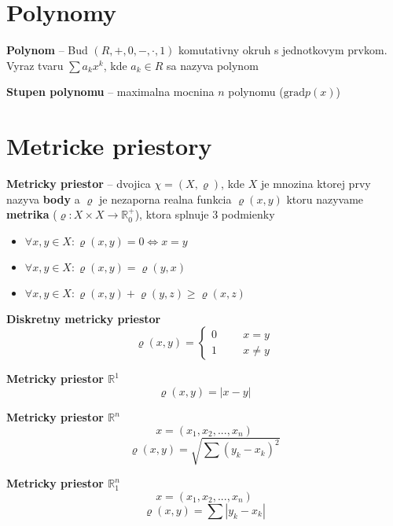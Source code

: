 \documentclass[12pt]{article}
\begin{document}
\section{Polynomy}
\textbf{Polynom} -- Bud $(R,+,0,-,\cdot,1)$ komutativny okruh s jednotkovym prvkom. Vyraz tvaru $\sum{a_{k}x^{k}}$,
kde $a_{k} \in R$ sa nazyva polynom

\textbf{Stupen polynomu} -- maximalna mocnina $n$ polynomu ($\text{grad}p(x)$)

\section{Metricke priestory}
\textbf{Metricky priestor} -- dvojica $\chi = (X, \varrho)$, kde $X$ je mnozina ktorej prvy nazyva \textbf{body} a $\varrho$ je nezaporna
realna funkcia $\varrho(x,y)$ ktoru nazyvame \textbf{metrika} ($\varrho: X \times X \to \mathbb{R}^{+}_{0}$), ktora splnuje 3 podmienky
\begin{itemize}
	\item $\forall x,y \in X: \varrho(x,y) = 0 \Leftrightarrow x = y$
	\item $\forall x,y \in X: \varrho(x,y) = \varrho(y,x)$
	\item $\forall x,y \in X: \varrho(x,y) + \varrho(y,z) \ge \varrho(x,z)$
\end{itemize}

\textbf{Diskretny metricky priestor}
\begin{equation*}
	\varrho(x,y) = \begin{cases}
		0 \hspace{1cm} x = y \\
		1 \hspace{1cm} x \not= y
	\end{cases}
\end{equation*}

\textbf{Metricky priestor $\mathbb{R}^{1}$}
\begin{equation*}
	\varrho(x,y) = |x-y|
\end{equation*}

\textbf{Metricky priestor $\mathbb{R}^{n}$}
\begin{equation*}
	x = (x_{1},x_{2},...,x_{n})
\end{equation*}
\begin{equation*}
	\varrho(x,y) = \sqrt{\sum{(y_{k} - x_{k})^{2}}}
\end{equation*}

\textbf{Metricky priestor $\mathbb{R}^{n}_{1}$}
\begin{equation*}
	x = (x_{1},x_{2},...,x_{n})
\end{equation*}
\begin{equation*}
	\varrho(x,y) = \sum{|y_{k} - x_{k}|}
\end{equation*}
\end{document}

